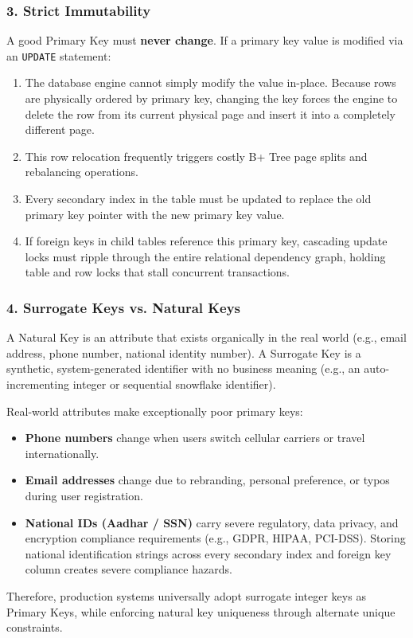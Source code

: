 \documentclass[10pt,journal,compsoc,onecolumn]{IEEEtran}
\begin{document}
\subsubsection{3. Strict Immutability}
A good Primary Key must \textbf{never change}. 
If a primary key value is modified via an \texttt{UPDATE} statement:
\begin{enumerate}
    \item The database engine cannot simply modify the value in-place. Because rows are physically ordered by primary key, changing the key forces the engine to delete the row from its current physical page and insert it into a completely different page.
    \item This row relocation frequently triggers costly B+ Tree page splits and rebalancing operations.
    \item Every secondary index in the table must be updated to replace the old primary key pointer with the new primary key value.
    \item If foreign keys in child tables reference this primary key, cascading update locks must ripple through the entire relational dependency graph, holding table and row locks that stall concurrent transactions.
\end{enumerate}

\subsubsection{4. Surrogate Keys vs. Natural Keys}
A Natural Key is an attribute that exists organically in the real world (e.g., email address, phone number, national identity number). A Surrogate Key is a synthetic, system-generated identifier with no business meaning (e.g., an auto-incrementing integer or sequential snowflake identifier).

Real-world attributes make exceptionally poor primary keys:
\begin{itemize}
    \item \textbf{Phone numbers} change when users switch cellular carriers or travel internationally.
    \item \textbf{Email addresses} change due to rebranding, personal preference, or typos during user registration.
    \item \textbf{National IDs (Aadhar / SSN)} carry severe regulatory, data privacy, and encryption compliance requirements (e.g., GDPR, HIPAA, PCI-DSS). Storing national identification strings across every secondary index and foreign key column creates severe compliance hazards.
\end{itemize}
Therefore, production systems universally adopt surrogate integer keys as Primary Keys, while enforcing natural key uniqueness through alternate unique constraints.
\end{document}
